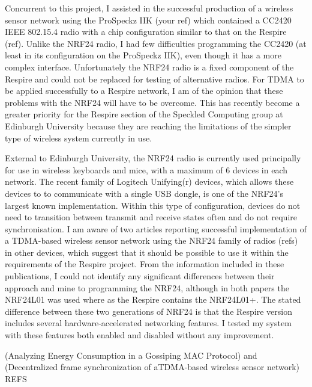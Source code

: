 Concurrent to this project, I assisted in the successful production of a wireless sensor network using
the ProSpeckz IIK (your ref) which contained a CC2420 IEEE 802.15.4 radio with a chip configuration
similar to that on the Respire (ref). Unlike the NRF24 radio, I had few difficulties programming the
CC2420 (at least in its configuration on the ProSpeckz IIK), even though it has a more complex
interface. Unfortunately the NRF24 radio is a fixed component of the Respire and could not be
replaced for testing of alternative radios. For TDMA to be applied successfully to a Respire network,
I am of the opinion that these problems with the NRF24 will have to be overcome. This has recently
become a greater priority for the Respire section of the Speckled Computing group at Edinburgh
University because they are reaching the limitations of the simpler type of wireless system currently
in use.


External to Edinburgh University, the NRF24 radio is currently used principally for use in wireless
keyboards and mice, with a maximum of 6 devices in each network. The recent family of Logitech
Unifying(r) devices, which allows these devices to to communicate with a single USB dongle, is one
of the NRF24’s largest known implementation. Within this type of configuration, devices do not need
to transition between transmit and receive states often and do not require synchronisation. I am
aware of two articles reporting successful implementation of a TDMA-based wireless sensor network
using the NRF24 family of radios (refs) in other devices, which suggest that it should be possible to
use it within the requirements of the Respire project. From the information included in these
publications, I could not identify any significant differences between their approach and mine to
programming the NRF24, although in both papers the NRF24L01 was used where as the Respire
contains the NRF24L01+. The stated difference between these two generations of NRF24 is that the
Respire version includes several hardware-accelerated networking features. I tested my system with
these features both enabled and disabled without any improvement.


(Analyzing Energy Consumption in a Gossiping MAC Protocol) and (Decentralized frame
synchronization of aTDMA-based wireless sensor network) REFS


